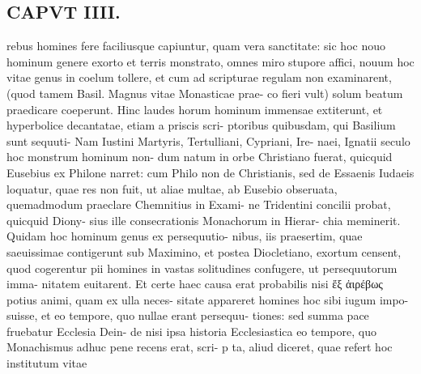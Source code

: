 \documentclass{article}
\begin{document}
\begin{pages}
\section*{CAPVT  IIII. }
\marginpar{[ p.215 ]}rebus homines fere faciliusque capiuntur, quam vera sanctitate: sic hoc nouo hominum genere exorto et terris monstrato, omnes miro stupore affici, nouum hoc vitae genus in coelum tollere, et cum ad scripturae regulam non examinarent, (quod tamem Basil. Magnus vitae Monasticae prae- co fieri vult) solum beatum praedicare coeperunt. Hinc laudes horum hominum immensae extiterunt, et hyperbolice decantatae, etiam a priscis scri- ptoribus quibusdam, qui Basilium sunt sequuti- Nam Iustini Martyris, Tertulliani, Cypriani, Ire- naei, Ignatii seculo hoc monstrum hominum non- dum natum in orbe Christiano fuerat, quicquid Eusebius ex Philone narret: cum Philo non de Christianis, sed de Essaenis Iudaeis loquatur, quae res non fuit, ut aliae multae, ab Eusebio obseruata, quemadmodum praeclare Chemnitius in Exami- ne Tridentini concilii probat, quicquid Diony- sius ille consecrationis Monachorum in Hierar- chia meminerit. Quidam hoc hominum genus ex persequutio- nibus, iis praesertim, quae saeuissimae contigerunt sub Maximino, et postea Diocletiano, exortum censent, quod cogerentur pii homines in vastas solitudines confugere, ut persequutorum imma- nitatem euitarent. Et certe haec causa erat probabilis nisi ἔξ ἀιρέβως potius animi, quam ex ulla neces- sitate appareret homines hoc sibi iugum impo- suisse, et eo tempore, quo nullae erant persequu- tiones: sed summa pace fruebatur Ecclesia Dein- de nisi ipsa historia Ecclesiastica eo tempore, quo Monachismus adhuc pene recens erat, scri- p ta, aliud diceret, quae refert hoc institutum vitae 

\end{pages}
\end{document}
